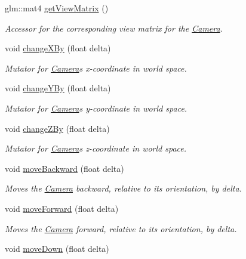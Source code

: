 \begin{DoxyCompactItemize}
glm\+::mat4 \hyperlink{classtsgl_1_1_camera_acb98691025f9ea89b63b06ee184409b4}{get\+View\+Matrix} ()
\begin{DoxyCompactList}\small\item\em Accessor for the corresponding view matrix for the \hyperlink{classtsgl_1_1_camera}{Camera}. \end{DoxyCompactList}\item 
void \hyperlink{classtsgl_1_1_camera_a011b8c82aff7e98b7c41aa6998006c56}{change\+X\+By} (float delta)
\begin{DoxyCompactList}\small\item\em Mutator for \hyperlink{classtsgl_1_1_camera}{Camera}\textquotesingle{}s x-\/coordinate in world space. \end{DoxyCompactList}\item 
void \hyperlink{classtsgl_1_1_camera_a9d6f2bd303dfd57068cbb35b4be0e78c}{change\+Y\+By} (float delta)
\begin{DoxyCompactList}\small\item\em Mutator for \hyperlink{classtsgl_1_1_camera}{Camera}\textquotesingle{}s y-\/coordinate in world space. \end{DoxyCompactList}\item 
void \hyperlink{classtsgl_1_1_camera_ab9aa61c8939c23f31801028adc0b5b4d}{change\+Z\+By} (float delta)
\begin{DoxyCompactList}\small\item\em Mutator for \hyperlink{classtsgl_1_1_camera}{Camera}\textquotesingle{}s z-\/coordinate in world space. \end{DoxyCompactList}\item 
void \hyperlink{classtsgl_1_1_camera_adda85f9211c54d33584cee240ed0ec47}{move\+Backward} (float delta)
\begin{DoxyCompactList}\small\item\em Moves the \hyperlink{classtsgl_1_1_camera}{Camera} backward, relative to its orientation, by delta. \end{DoxyCompactList}\item 
void \hyperlink{classtsgl_1_1_camera_a9f8d73bb09703cfe3e46dea725dca49a}{move\+Forward} (float delta)
\begin{DoxyCompactList}\small\item\em Moves the \hyperlink{classtsgl_1_1_camera}{Camera} forward, relative to its orientation, by delta. \end{DoxyCompactList}\item 
void \hyperlink{classtsgl_1_1_camera_ac672a6337590083e320be253bfe38ba1}{move\+Down} (float delta)

\end{DoxyCompactItemize}
